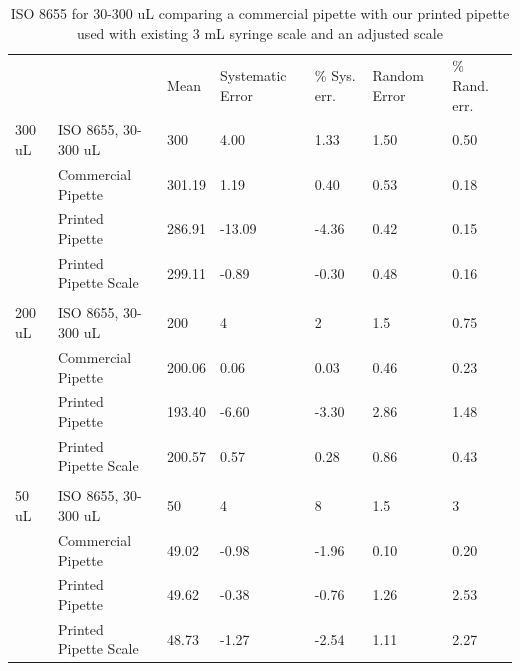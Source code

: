 \documentclass[10pt,letterpaper]{article}
\begin{document}
\begin{table}[!ht]
\begin{adjustwidth}{-2.25in}{0in} %
\centering
\caption{ISO 8655 for 30-300 uL comparing a commercial pipette with our printed pipette used with existing 3 mL syringe scale and an adjusted scale}
\label{table4}
\begin{tabular}{lllllll}
       &                       & Mean   & Systematic Error & \% Sys. err. & Random Error & \% Rand. err. \\
300 uL & ISO 8655, 30-300 uL   & 300    & 4.00             & 1.33         & 1.50         & 0.50          \\
       & Commercial Pipette    & 301.19 & 1.19             & 0.40         & 0.53         & 0.18          \\
       & Printed Pipette       & 286.91 & -13.09           & -4.36        & 0.42         & 0.15          \\
       & Printed Pipette Scale & 299.11 & -0.89            & -0.30        & 0.48         & 0.16          \\
       &                       &        &                  &              &              &               \\
200 uL & ISO 8655, 30-300 uL   & 200    & 4                & 2            & 1.5          & 0.75          \\
       & Commercial Pipette    & 200.06 & 0.06             & 0.03         & 0.46         & 0.23          \\
       & Printed Pipette       & 193.40 & -6.60            & -3.30        & 2.86         & 1.48          \\
       & Printed Pipette Scale & 200.57 & 0.57             & 0.28         & 0.86         & 0.43          \\
       &                       &        &                  &              &              &               \\
50 uL  & ISO 8655, 30-300 uL   & 50     & 4                & 8            & 1.5          & 3             \\
       & Commercial Pipette    & 49.02  & -0.98            & -1.96        & 0.10         & 0.20          \\
       & Printed Pipette       & 49.62  & -0.38            & -0.76        & 1.26         & 2.53          \\
       & Printed Pipette Scale & 48.73  & -1.27            & -2.54        & 1.11         & 2.27          \\

\end{tabular}
\end{adjustwidth}
\end{table}
\end{document}
